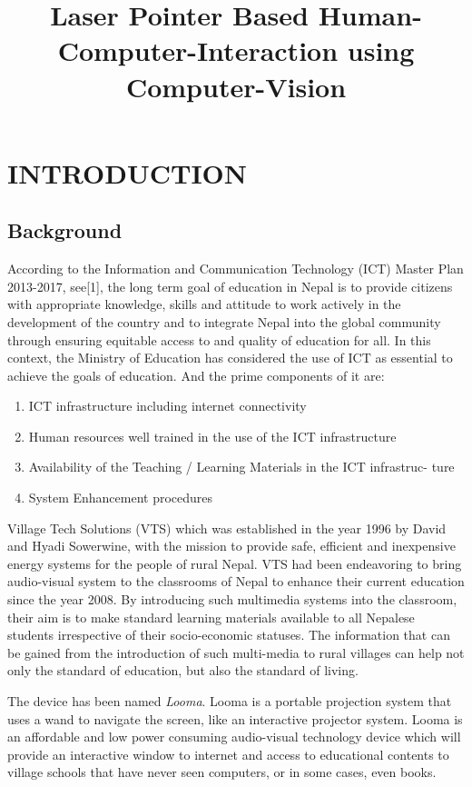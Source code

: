 \documentclass[12pt, a4paper]{article}
\title{\textbf{Laser Pointer Based Human-Computer-Interaction using Computer-Vision}}
\begin{document}
	\listoffigures
	\listoftables
	\newpage
	\tableofcontents 
	\newpage

\newpage
\section{INTRODUCTION}
\subsection{Background}
According to the Information and Communication Technology (ICT) Master Plan 2013-2017, see[1], the long term
goal of education in Nepal is to provide citizens with appropriate knowledge,
skills and attitude to work actively in the development of the country and to
integrate Nepal into the global community through ensuring equitable access
to and quality of education for all. In this context, the Ministry of Education
has considered the use of ICT as essential to achieve the goals of education. And the prime components of it are:
\begin{enumerate}
\item ICT infrastructure including internet connectivity
\item Human resources well trained in the use of the ICT infrastructure
\item Availability of the Teaching / Learning Materials in the ICT infrastruc-
ture
\item System Enhancement procedures
\end{enumerate}

Village Tech Solutions (VTS) which was established in the year 1996 by David and Hyadi Sowerwine, with the mission to provide safe, efficient and inexpensive energy systems for the people of rural Nepal. VTS had been endeavoring to bring audio-visual system to the classrooms of Nepal to enhance their current education since the year 2008. By introducing such multimedia systems into the classroom, their aim is to make standard learning materials available to all Nepalese students irrespective of their socio-economic statuses. The information that can be gained from the introduction of such multi-media to rural villages can help not only the
standard of education, but also the standard of living. 

The device has been named \emph {Looma}. Looma is a portable projection system that uses a wand to navigate the screen, like an interactive projector system. Looma is an affordable and low power consuming audio-visual technology device which will provide an interactive window to internet and access to educational contents to village schools that have never seen computers, or in some cases, even books.
\end{document}

